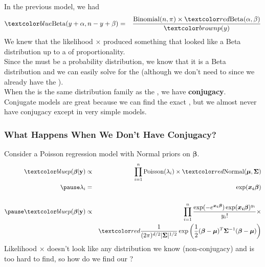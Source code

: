 \documentclass[handout]{beamer}
\begin{document}
\begin{frame}
In the previous model, we had
\footnotesize
\begin{eqnarray*}
\blue{\mathrm{Beta}(y+\alpha, n-y+\beta)} &=& \frac{\mathrm{Binomial}(n, \pi) \times
\red{\mathrm{Beta}(\alpha, \beta)}}{\brown{p(y)}}\\
\end{eqnarray*}
\normalsize
\pause
We knew that the likelihood $\times$  produced something
that looked like a Beta distribution up to a  of
proportionality. \\
\pause
\bigskip
Since the  must be a probability distribution, we know
that it is a Beta distribution and we can easily solve for the
 \pause (although we don't need to since we
already have the ). \\
\bigskip
\pause
When the  is the same distribution family as the
, we have {\bf conjugacy}. \\
\bigskip
\pause
Conjugate models are great because we can find the exact
, \pause but we almost never have conjugacy except in
very simple models.
\end{frame}

\begin{frame}
\frametitle{What Happens When We Don't Have Conjugacy?}
\pause
Consider a Poisson regression model with Normal priors on
$\bm{\beta}$.
\pause
\footnotesize
\begin{eqnarray*}
\blue{p(\bm{\beta} | \mathbf{y})} &\propto& \prod_{i=1}^n
\mathrm{Poisson}(\lambda_i) \times \red{\mathrm{Normal}(\bm{\mu},
\bm{\Sigma})}\\
\pause
\lambda_i &=& \exp(\bm{x_i \beta})\\\\
\pause
\blue{p(\bm{\beta} | \mathbf{y})} &\propto& \prod_{i=1}^n
\frac{\exp(-e^{\bm{x_i \beta}}) \exp(\bm{x_i \beta})^{y_i}}{y_i!}
\times \\
&\phantom{\propto}& \red{\frac{1}{(2\pi)^{d/2} |\bm{\Sigma}|^{1/2}}
\exp\left(\frac{1}{2} (\bm{\beta} - \bm{\mu})^T \bm{\Sigma}^{-1} (\bm{\beta} - \bm{\mu})\right)}\\
\end{eqnarray*}
\normalsize
\pause
Likelihood $\times$  doesn't look like any distribution we
know (non-conjugacy) \pause and  is too hard to find, \pause
so how do we find our ?
\end{frame}
\end{document}
